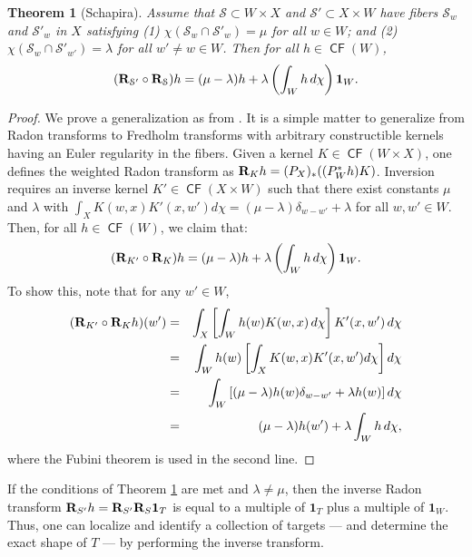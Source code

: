 \documentclass{psapm-l}
\newtheorem{theorem}{Theorem}[section]
\theoremstyle{definition}
\theoremstyle{remark}
\numberwithin{equation}{section}
\begin{document}
\begin{theorem}[Schapira]
\label{thm:invradon}
Assume that ${{\mathcal S}}\subset W\times X$ and ${{\mathcal S}}'\subset X\times W$ have fibers ${{\mathcal S}}_w$ and ${{\mathcal S}}'_w$ in $X$ satisfying (1) $\chi({{\mathcal S}}_w\cap{{\mathcal S}}'_w)=\mu$ for all $w\in W$; and (2) $\chi({{\mathcal S}}_w\cap{{\mathcal S}}'_{w'})=\lambda$ for all $w'\neq w \in W$. Then for all $h\in {{{\operatorname{\mathsf{{CF}}}}}}(W)$,
\begin{equation}
\label{eq:schapira}
    ({{\bf R}}_{{{\mathcal S}}'}\circ{{\bf R}}_{{\mathcal S}})h
    =
    (\mu-\lambda)h
    + \lambda\left(\int_W h\,d\chi\right){{\mathbf{1}}}_W
    .
\end{equation}
\end{theorem}
\begin{proof}
We prove a generalization as from \cite{BGL}. It is a simple matter to generalize from Radon transforms to Fredholm transforms with arbitrary constructible kernels having an Euler regularity in the fibers. Given a kernel $K\in{{{\operatorname{\mathsf{{CF}}}}}}(W\times X)$, one defines the weighted Radon transform as ${{\bf R}}_K h = (P_X)_*((P_W^*h)K)$. Inversion requires an inverse kernel $K' \in {{{\operatorname{\mathsf{{CF}}}}}}(X \times W)$ such that there exist constants $\mu$ and $\lambda$ with
$\int_X  K(w,x) K'(x,w') d\chi=(\mu-\lambda)\delta_{w-w'} + \lambda$ for all $w,w' \in W$. Then, for all $h \in {{{\operatorname{\mathsf{{CF}}}}}}(W)$, we claim that:
\begin{equation}
\label{eq:weightedRadon}
         ({{\bf R}}_{K'}\circ{{\bf R}}_K)h = (\mu-\lambda) h + \lambda\left(\int_W h\, d\chi\right){{\mathbf{1}}}_{W}.
\end{equation}
To show this, note that for any $w' \in W$,
\begin{eqnarray*}
    ({{\bf R}}_{K'}\circ{{\bf R}}_{K}h)(w')
    & = & \int_{X} \left[\int_{W} h(w)K(w,x)\,d\chi \right] K'(x,w')\,d\chi \\
    & = & \int_{W} h(w)\left[\int_{X}  K(w,x) K'(x,w') d\chi\right] d\chi  \\
    & = & \int_{W} \left[ (\mu-\lambda) h(w)\delta_{w-w'} + \lambda h(w)\right] d\chi    \\
    & = & (\mu-\lambda)h(w') + \lambda\int_W h\,d\chi ,
\end{eqnarray*}
where the Fubini theorem is used in the second line.
\end{proof}

If the conditions of Theorem \ref{thm:invradon} are met and $\lambda\neq\mu$, then the inverse Radon transform ${{\bf R}}_{S'}h={{\bf R}}_{S'}{{\bf R}}_S{{\mathbf{1}}}_T$ is equal to a multiple of ${{\mathbf{1}}}_T$ plus a multiple of ${{\mathbf{1}}}_W$. Thus, one can localize and identify a collection of targets --- and determine the exact shape of $T$ --- by performing the inverse transform.
\end{document}
